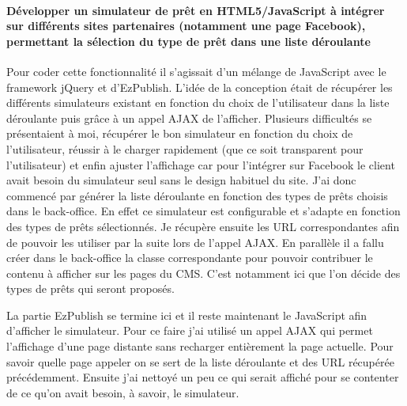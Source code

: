 \documentclass[a4paper,11pt,twoside]{report}
\begin{document}
      \paragraph*{Développer un simulateur de prêt en HTML5/JavaScript à intégrer sur différents sites partenaires (notamment une page Facebook), permettant la sélection du type de prêt dans une liste déroulante}
      Pour coder cette fonctionnalité il s'agissait d'un mélange de JavaScript avec le framework jQuery et d'EzPublish. L'idée de la conception était de récupérer les différents simulateurs existant en fonction du choix de l'utilisateur dans la liste déroulante puis grâce à un appel AJAX de l'afficher. Plusieurs difficultés se présentaient à moi, récupérer le bon simulateur en fonction du choix de l'utilisateur, réussir à le charger rapidement (que ce soit transparent pour l'utilisateur) et enfin ajuster l'affichage car pour l'intégrer sur Facebook le client avait besoin du simulateur seul sans le design habituel du site. J'ai donc commencé par générer la liste déroulante en fonction des types de prêts choisis dans le back-office. En effet ce simulateur est configurable et s'adapte en fonction des types de prêts sélectionnés. Je récupère ensuite les URL correspondantes afin de pouvoir les utiliser par la suite lors de l'appel AJAX. En parallèle il a fallu créer dans le back-office la classe correspondante pour pouvoir contribuer le contenu à afficher sur les pages du CMS. C'est notamment ici que l'on décide des types de prêts qui seront proposés.
      \label{global_loan_simulator_1}
      
      La partie EzPublish se termine ici et il reste maintenant le JavaScript afin d'afficher le simulateur. Pour ce faire j'ai utilisé un appel AJAX qui permet l'affichage d'une page distante sans recharger entièrement la page actuelle. Pour savoir quelle page appeler on se sert de la liste déroulante et des URL récupérée précédemment. Ensuite j'ai nettoyé un peu ce qui serait affiché pour se contenter de ce qu'on avait besoin, à savoir, le simulateur.
      \label{global_loan_simulator_2}
      
\end{document}
